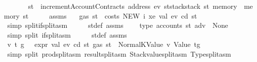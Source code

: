 \begin{isabellebody}
\ \ \ \ \ \ \ {\isachardoublequoteopen}st{\isacharprime}{\kern0pt}\ {\isacharequal}{\kern0pt}\ incrementAccountContracts\ {\isacharparenleft}{\kern0pt}address\ ev{\isacharparenright}{\kern0pt}\ {\isacharparenleft}{\kern0pt}st{\isacharprime}{\kern0pt}{\isacharprime}{\kern0pt}{\isasymlparr}stack{\isacharcolon}{\kern0pt}{\isacharequal}{\kern0pt}stack\ st{\isacharcomma}{\kern0pt}\ memory\ {\isacharcolon}{\kern0pt}{\isacharequal}{\kern0pt}\ memory\ st{\isasymrparr}{\isacharparenright}{\kern0pt}{\isachardoublequoteclose}\isanewline
%
\isadelimproof
%
\endisadelimproof
%
\isatagproof
{}\isamarkupfalse%
\ {\isacharminus}{\kern0pt}\isanewline
\ \ \isamarkupfalse%
\ assms\ \isamarkupfalse%
\ {}{\isacharcolon}{\kern0pt}\ {\isachardoublequoteopen}gas\ st\ {\isachargreater}{\kern0pt}\ costs\ {\isacharparenleft}{\kern0pt}NEW\ i\ xe\ val{\isacharparenright}{\kern0pt}\ ev\ cd\ st{\isachardoublequoteclose}\ \isamarkupfalse%
\ {\isacharparenleft}{\kern0pt}simp\ split{\isacharcolon}{\kern0pt}if{\isacharunderscore}{\kern0pt}split{\isacharunderscore}{\kern0pt}asm{\isacharparenright}{\kern0pt}\isanewline
\ \ \isamarkupfalse%
\ \isamarkupfalse%
\ st{}{\isacharunderscore}{\kern0pt}def\ assms\ {}\ \isamarkupfalse%
\ {}{\isacharcolon}{\kern0pt}\ {\isachardoublequoteopen}type\ {\isacharparenleft}{\kern0pt}accounts\ st\ adv{}{\isacharparenright}{\kern0pt}\ {\isacharequal}{\kern0pt}\ None{\isachardoublequoteclose}\ \isamarkupfalse%
\ {\isacharparenleft}{\kern0pt}simp\ split{\isacharcolon}{\kern0pt}\ if{\isacharunderscore}{\kern0pt}split{\isacharunderscore}{\kern0pt}asm{\isacharparenright}{\kern0pt}\isanewline
\ \ \isamarkupfalse%
\ \isamarkupfalse%
\ st{}{\isacharunderscore}{\kern0pt}def\ assms\ {}\ {}\ \isamarkupfalse%
\ v\ t\ g\ \ {}{\isacharcolon}{\kern0pt}\ {\isachardoublequoteopen}expr\ val\ ev\ cd\ st{}\ {\isacharparenleft}{\kern0pt}gas\ st{}{\isacharparenright}{\kern0pt}\ {\isacharequal}{\kern0pt}\ Normal{\isacharparenleft}{\kern0pt}{\isacharparenleft}{\kern0pt}KValue\ v{\isacharcomma}{\kern0pt}\ Value\ t{\isacharparenright}{\kern0pt}{\isacharcomma}{\kern0pt}g{\isacharparenright}{\kern0pt}{\isachardoublequoteclose}\ \isamarkupfalse%
\ {\isacharparenleft}{\kern0pt}simp\ split{\isacharcolon}{\kern0pt}\ prod{\isachardot}{\kern0pt}split{\isacharunderscore}{\kern0pt}asm\ result{\isachardot}{\kern0pt}split{\isacharunderscore}{\kern0pt}asm\ Stackvalue{\isachardot}{\kern0pt}split{\isacharunderscore}{\kern0pt}asm\ Type{\isachardot}{\kern0pt}split{\isacharunderscore}{\kern0pt}asm{\isacharparenright}{\kern0pt}\isanewline

\end{isabellebody}
